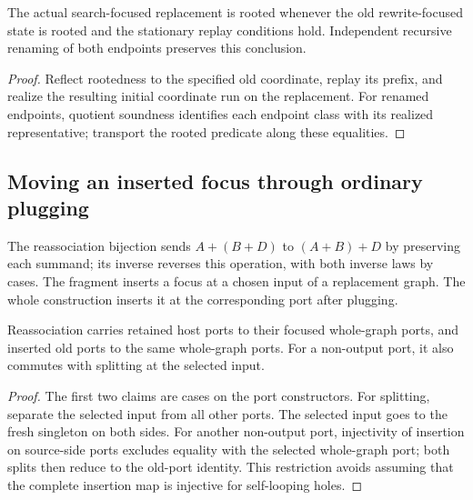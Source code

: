 \begin{theorem}
The actual search-focused replacement is rooted whenever the old
rewrite-focused state is rooted and the stationary replay conditions hold.
Independent recursive renaming of both endpoints preserves this conclusion.
\end{theorem}
\begin{proof}
Reflect rootedness to the specified old coordinate, replay its prefix, and
realize the resulting initial coordinate run on the replacement. For renamed
endpoints, quotient soundness identifies each endpoint class with its realized
representative; transport the rooted predicate along these equalities.
\end{proof}


\subsection{Moving an inserted focus through ordinary plugging}

\begin{definition}
The reassociation bijection sends $A+(B+D)$ to $(A+B)+D$ by preserving each
summand; its inverse reverses this operation, with both inverse laws by cases.
The fragment inserts a focus at a chosen input of a replacement graph. The
whole construction inserts it at the corresponding port after plugging.
\end{definition}


\begin{lemma}
Reassociation carries retained host ports to their focused whole-graph ports,
and inserted old ports to the same whole-graph ports. For a non-output port,
it also commutes with splitting at the selected input.
\end{lemma}
\begin{proof}
The first two claims are cases on the port constructors. For splitting, separate
the selected input from all other ports. The selected input goes to the fresh
singleton on both sides. For another non-output port, injectivity of insertion
on source-side ports excludes equality with the selected whole-graph port;
both splits then reduce to the old-port identity. This restriction avoids
assuming that the complete insertion map is injective for self-looping holes.
\end{proof}


